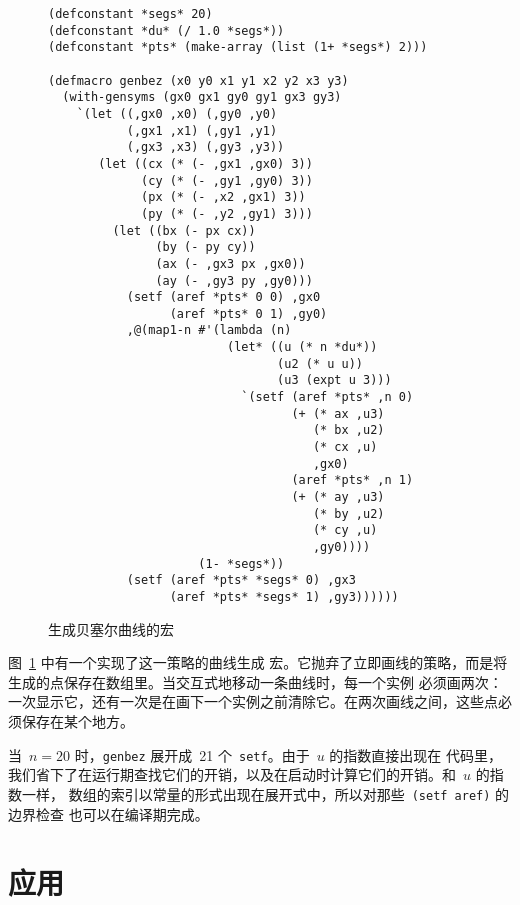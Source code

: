 \begin{figure}
\begin{lstlisting}
(defconstant *segs* 20)
(defconstant *du* (/ 1.0 *segs*))
(defconstant *pts* (make-array (list (1+ *segs*) 2)))

(defmacro genbez (x0 y0 x1 y1 x2 y2 x3 y3)
  (with-gensyms (gx0 gx1 gy0 gy1 gx3 gy3)
    `(let ((,gx0 ,x0) (,gy0 ,y0)
           (,gx1 ,x1) (,gy1 ,y1)
           (,gx3 ,x3) (,gy3 ,y3))
       (let ((cx (* (- ,gx1 ,gx0) 3))
             (cy (* (- ,gy1 ,gy0) 3))
             (px (* (- ,x2 ,gx1) 3))
             (py (* (- ,y2 ,gy1) 3)))
         (let ((bx (- px cx))
               (by (- py cy))
               (ax (- ,gx3 px ,gx0))
               (ay (- ,gy3 py ,gy0)))
           (setf (aref *pts* 0 0) ,gx0
                 (aref *pts* 0 1) ,gy0)
           ,@(map1-n #'(lambda (n)
                         (let* ((u (* n *du*))
                                (u2 (* u u))
                                (u3 (expt u 3)))
                           `(setf (aref *pts* ,n 0)
                                  (+ (* ax ,u3)
                                     (* bx ,u2)
                                     (* cx ,u)
                                     ,gx0)
                                  (aref *pts* ,n 1)
                                  (+ (* ay ,u3)
                                     (* by ,u2)
                                     (* cy ,u)
                                     ,gy0))))
                     (1- *segs*))
           (setf (aref *pts* *segs* 0) ,gx3
                 (aref *pts* *segs* 1) ,gy3))))))
\end{lstlisting}
  \caption{生成贝塞尔曲线的宏}
  \label{fig:macro_for_generating_bezier_curves}
\end{figure}

图~\ref{fig:macro_for_generating_bezier_curves} 中有一个实现了这一策略的曲线生成
宏。它抛弃了立即画线的策略，而是将生成的点保存在数组里。当交互式地移动一条曲线时，每一个实例
必须画两次：一次显示它，还有一次是在画下一个实例之前清除它。在两次画线之间，这些点必须保存在某个地方。

当~$n=20$ 时，\verb|genbez| 展开成~21 个~\verb|setf|。由于~$u$ 的指数直接出现在
代码里，我们省下了在运行期查找它们的开销，以及在启动时计算它们的开销。和~$u$ 的指数一样，
数组的索引以常量的形式出现在展开式中，所以对那些~\verb|(setf aref)| 的边界检查
也可以在编译期完成。

\section{应用}
\label{sec:compile-time:applications}

